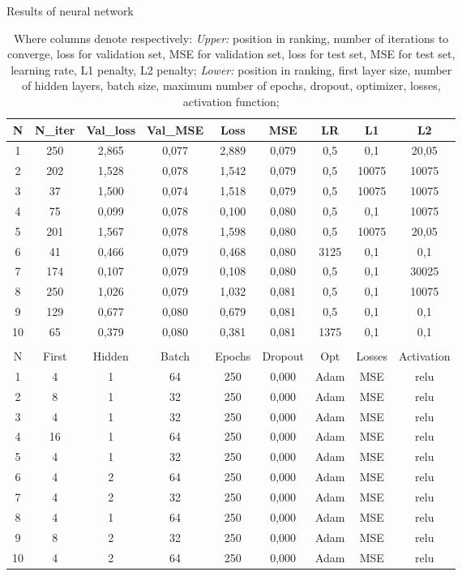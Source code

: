 \documentclass{Trade_template}
\numberwithin{equation}{section}
\begin{document}
\begin{table}[!htp] \label{Results}
\footnotesize{
\centering
\caption{Results of neural network}
\begin{tabular}{*{9}{c}}
\toprule
N & N\_iter & Val\_loss & Val\_MSE & Loss & MSE & LR & L1 & L2 \\ \midrule
1 & 250 & 2,865 & 0,077 & 2,889 & 0,079 & 0,5 & 0,1 & 20,05 \\
2 & 202 & 1,528 & 0,078 & 1,542 & 0,079 & 0,5 & 10075 & 10075 \\
3 & 37 & 1,500 & 0,074 & 1,518 & 0,079 & 0,5 & 10075 & 10075\\
4 & 75 & 0,099 & 0,078 & 0,100 & 0,080 & 0,5 & 0,1 & 10075 \\
5 & 201 & 1,567 & 0,078 & 1,598 & 0,080 & 0,5 & 10075 & 20,05 \\
6 & 41 & 0,466 & 0,079 & 0,468 & 0,080 & 3125 & 0,1 & 0,1\\
7 & 174 & 0,107 & 0,079 & 0,108 & 0,080 & 0,5 & 0,1 & 30025 \\
8 & 250 & 1,026 & 0,079 & 1,032 & 0,081 & 0,5 & 0,1 & 10075 \\
9 & 129 & 0,677 & 0,080 & 0,679 & 0,081 & 0,5 & 0,1 & 0,1 \\
10 & 65 & 0,379 & 0,080 & 0,381 & 0,081 & 1375 & 0,1 & 0,1 \\ \bottomrule
& & & & & & & &  \\
N & First  & Hidden & Batch & Epochs & Dropout & Opt & Losses & Activation \\ \midrule
1 & 4 & 1 & 64 & 250 & 0,000 &   Adam & MSE & relu \\
2 & 8 & 1 & 32 & 250 & 0,000 &   Adam & MSE & relu \\
3 & 4 & 1 & 32 & 250 & 0,000 &   Adam & MSE & relu \\
4 & 16 & 1 & 64 & 250 & 0,000 &   Adam & MSE & relu \\
5 & 4 & 1 & 32 & 250 & 0,000 &   Adam & MSE & relu \\
6 & 4 & 2 & 64 & 250 & 0,000 &   Adam & MSE & relu \\
7 & 4 & 2 & 32 & 250 & 0,000 &   Adam & MSE & relu \\
8 & 4 & 1 & 64 & 250 & 0,000 &   Adam & MSE & relu \\
9 & 8 & 2 & 32 & 250 & 0,000 &   Adam & MSE & relu \\
10 & 4 & 2 & 64 & 250 & 0,000 &   Adam & MSE & relu \\ \bottomrule
\end{tabular}
\caption*{\small{Where columns denote respectively: \textit{Upper:} position in ranking, number of iterations to converge, loss for validation set, MSE for validation set, loss for test set, MSE for test set, learning rate, L1 penalty, L2 penalty; \textit{Lower:} position in ranking, first layer size, number of hidden layers, batch size, maximum number of epochs, dropout, optimizer, losses, activation function;}}}
\end{table}
\end{document}
